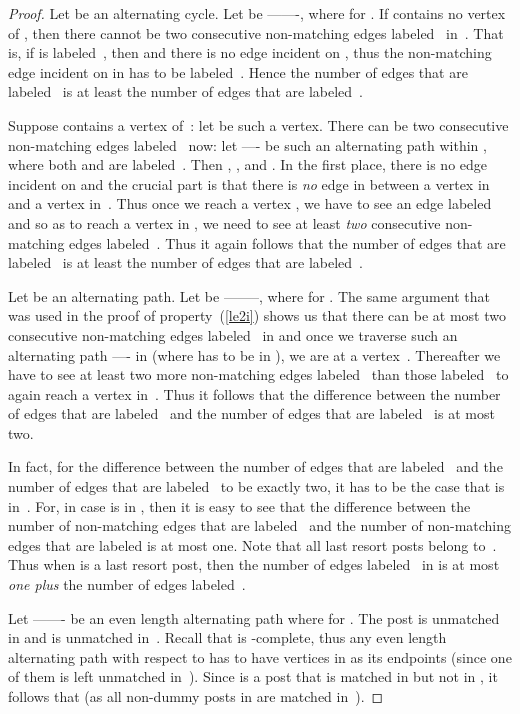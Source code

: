 \documentclass[11pt]{llncs}
\begin{document}
\begin{proof}
 Let  be an alternating cycle. Let  be 
-------, 
where  for . If  contains no vertex of , then there cannot
be two consecutive non-matching edges labeled~ in~. That is, if  is 
labeled~, then  and there is no  edge incident on , thus the non-matching edge incident on  
in  has to be labeled~. Hence the number of edges that are labeled~ is at least the number of edges 
that are labeled~.

Suppose  contains a vertex of~: let  be such a vertex. There can be two consecutive non-matching edges labeled~ now: let ---- be such an alternating path within , where both  and  are labeled~. Then , , and . In the first place, there is no  edge incident on  and the crucial part is that there is {\em no} edge in  between a vertex in  and a vertex in~. Thus once we reach a vertex , we have to see an edge labeled   and so as to reach a vertex in , we need to see at least {\em two} consecutive non-matching edges labeled~. Thus it again follows that the number of edges that are labeled~ is at least the number of edges that are labeled~.

\medskip

 Let  be an alternating path. Let  be
--------, where  for 
. The same argument that was used in the proof of property~(\ref{le2i}) shows us that 
there can be at most two consecutive non-matching edges labeled~ in  and once we 
traverse such an alternating path ---- in  (where  
has to be in ), we are at a vertex~. Thereafter we have to see at least two more 
non-matching edges 
labeled~ than those labeled~ to again reach a vertex in~. Thus it follows that the 
difference between the number of edges that are labeled~ and the number of edges that are 
labeled~ is at most two.
 
In fact, for the difference between the number of edges that are labeled~ and the number of 
edges that are labeled~ to be exactly two, it has to be the case that  is in~. For, in 
case  is in , then it is easy to see that the difference between the number of 
non-matching edges that are labeled~ and the number of non-matching edges that are labeled 
 is at most one. Note that all last resort posts belong to~. Thus when  is a last 
resort post, then the number of edges labeled~ in  is at most {\em one plus} the 
number of edges labeled~.

\medskip

 Let ------- be an 
even length alternating path where  for . The post  is unmatched in  
and  is unmatched in~. Recall that  is -complete, thus any even length alternating path with 
respect to  has to have vertices in  as its endpoints (since one of them is left unmatched in~). 
Since  is a post that is matched in  but not in , it follows that  (as all non-dummy 
posts in  are matched in~).


\end{proof}
\end{document}
